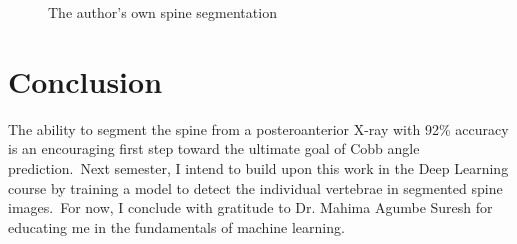\documentclass[conference]{IEEEtran}
\begin{document}
    \begin{figure}
        \caption{The author's own spine segmentation}
        \label{fig:results5}
        \centering
    \end{figure}

    \section{Conclusion}\label{sec:conclusion}

    The ability to segment the spine from a posteroanterior X-ray with 92\% accuracy is an encouraging first step toward the ultimate goal of Cobb angle prediction.\ Next semester, I intend to build upon this work in the Deep Learning course by training a model to detect the individual vertebrae in segmented spine images.\ For now, I conclude with gratitude to Dr. Mahima Agumbe Suresh for educating me in the fundamentals of machine learning.

    \newpage

    
    
\end{document}
